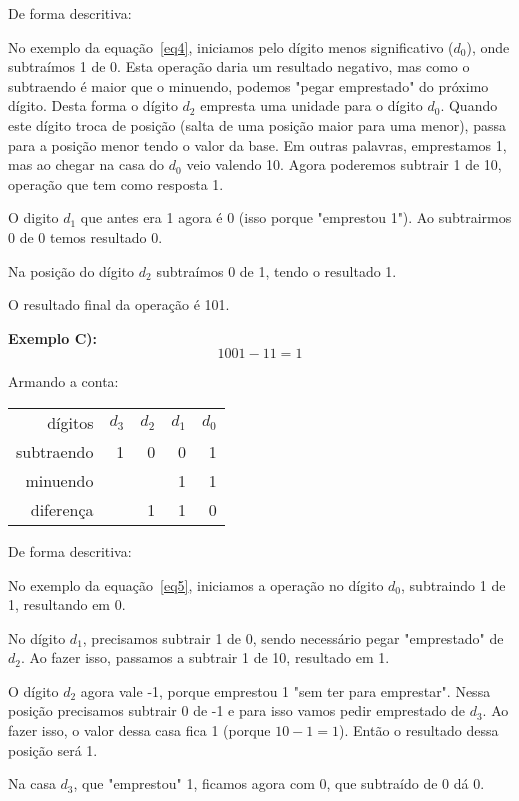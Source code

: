 De forma descritiva: 

No exemplo da equação~\ref{eq4}, iniciamos pelo dígito menos significativo ($d_0$), onde subtraímos 1 de 0. Esta operação daria um resultado negativo, mas como o subtraendo é maior que o minuendo, podemos "pegar emprestado" do próximo dígito. Desta forma o dígito $d_2$ empresta uma unidade para o dígito $d_0$. Quando este dígito troca de posição (salta de uma posição maior para uma menor), passa para a posição menor tendo o valor da base. Em outras palavras, emprestamos 1, mas ao chegar na casa do $d_0$ veio valendo 10. Agora poderemos subtrair 1 de 10, operação que tem como resposta 1.

O digito $d_1$ que antes era 1 agora é 0 (isso porque "emprestou 1"). Ao subtrairmos 0 de 0 temos resultado 0.

Na posição do dígito $d_2$ subtraímos 0 de 1, tendo o resultado 1.

O resultado final da operação é 101.

\textbf{Exemplo C):}
\begin{equation}\label{eq5}
1001 - 11 = 1
\end{equation}

Armando a conta:
\begin{table}[h]
	\centering
	\begin{tabular}{r|rrrr}
		dígitos		& $d_3$	& $d_2$ & $d_1$ & $d_0$ \\
		subtraendo  &  	1	&   0 	&   0 	& 1 \\
		minuendo 	&  		&   	& 	1 	& 1 \\
		\hline
		diferença  	&  		&   1 	&   1 	& 0 \\
	\end{tabular}
\end{table}

De forma descritiva: 

No exemplo da equação~\ref{eq5}, iniciamos a operação no dígito $d_0$, subtraindo 1 de 1, resultando em 0.

No dígito $d_1$, precisamos subtrair 1 de 0, sendo necessário pegar "emprestado" de $d_2$. Ao fazer isso, passamos a subtrair 1 de 10, resultado em 1.

O dígito $d_2$ agora vale -1, porque emprestou 1 "sem ter para emprestar". Nessa posição precisamos subtrair 0 de -1 e para isso vamos pedir emprestado de $d_3$. Ao fazer isso, o valor dessa casa fica 1 (porque $10 - 1 = 1 $). Então o resultado dessa posição será 1.

Na casa $d_3$, que "emprestou" 1, ficamos agora com 0, que subtraído de 0 dá 0.

